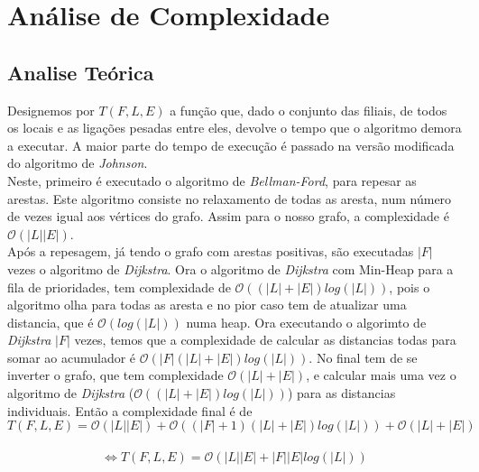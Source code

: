 \documentclass[12pt]{article}
\begin{document}
\section{Análise de Complexidade}
\subsection{Analise Teórica}
Designemos por $T(F, L ,E)$ a função que, dado o conjunto das filiais, de todos os locais e as ligações pesadas entre eles, devolve o tempo que o algoritmo demora a executar.
A maior parte do tempo de execução é passado na versão modificada do algoritmo de \textit{Johnson}. \\
\indent Neste, primeiro é executado o algoritmo de \textit{Bellman-Ford}\cite{bellman1956routing}, para repesar as arestas. Este algoritmo consiste no relaxamento de todas as aresta, num número de vezes igual aos vértices do grafo. Assim para o nosso grafo, a complexidade é $\mathcal{O}(|L||E|)$. \\
\indent Após a repesagem, já tendo o grafo com arestas positivas, são executadas $|F|$ vezes o algoritmo de \textit{Dijkstra}. Ora o algoritmo de \textit{Dijkstra} com Min-Heap para a fila de prioridades, tem complexidade de $\mathcal{O}((|L|+|E|)log(|L|))$, pois o algoritmo olha para todas as aresta e no pior caso tem de atualizar uma distancia, que é $\mathcal{O}(log(|L|))$ numa heap. Ora executando o algorimto de \textit{Dijkstra} $|F|$ vezes, temos que a complexidade de calcular as distancias todas para somar ao acumulador é $\mathcal{O}(|F|(|L|+|E|)log(|L|))$. No final tem de se inverter o grafo, que tem complexidade $\mathcal{O}(|L|+|E|)$, e calcular mais uma vez o algoritmo de \textit{Dijkstra} ($\mathcal{O}((|L|+|E|)log(|L|))$) para as distancias individuais. Então a complexidade final é de \[ T(F, L ,E) = \mathcal{O}(|L||E|) + \mathcal{O}((|F|+1)(|L|+|E|)log(|L|)) + \mathcal{O}(|L|+|E|)\] \\
\[ \Leftrightarrow  T(F, L ,E) = \mathcal{O}(|L||E| + |F||E|log(|L|))\]
\end{document}
